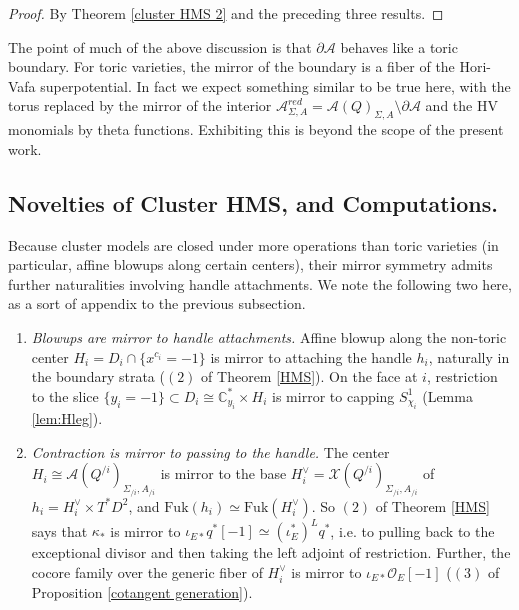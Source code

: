 \documentclass[11pt]{amsart}
\theoremstyle{definition}
\theoremstyle{remark}
\newcommand{\A}{\mathcal{A}}
\newcommand{\Fuk}{\mathrm{Fuk}}
\numberwithin{equation}{section}
\begin{document}
\begin{proof}
    By Theorem \ref{cluster HMS 2} and the preceding three results.
\end{proof}

The point of much of the above discussion is that $\partial \A$ behaves like a toric boundary. For toric varieties, the mirror of the boundary is a fiber of the Hori-Vafa superpotential. In fact we expect something similar to be true here, with the torus replaced by the mirror of the interior $\A^{red}_{\Sigma, A} = \A(Q)_{\Sigma,A}\setminus \partial \A$ and the HV monomials by theta functions. Exhibiting this is beyond the scope of the present work.

\subsection{Novelties of Cluster HMS, and Computations.}

Because cluster models are closed under more operations than toric varieties (in particular, affine blowups along certain centers), their mirror symmetry admits further naturalities involving handle attachments. We note the following two here, as a sort of appendix to the previous subsection.

\begin{enumerate}
    \item \textit{Blowups are mirror to handle attachments.} Affine blowup along the non-toric center $H_i=D_i\cap\{x^{c_i}=-1\}$ is mirror to attaching the handle $h_i$, naturally in the boundary strata ($(2)$ of Theorem \ref{HMS}). On the face at $i$, restriction to the slice $\{y_i=-1\}\subset D_i\cong\mathbb C^*_{y_i}\times H_i$ is mirror to capping $S^1_{\chi_i}$ (Lemma \ref{lem:Hleg}).

    \item \textit{Contraction is mirror to passing to the handle.} The center $H_i\cong\mathcal A(Q^{/i})_{\Sigma_{/i},A_{/i}}$ is mirror to the base $H_i^\vee=\mathcal X(Q^{/i})_{\Sigma_{/i},A_{/i}}$ of $h_i=H_i^\vee\times T^*D^2$, and $\Fuk(h_i) \simeq \Fuk(H_i^\vee)$. So $(2)$ of Theorem \ref{HMS} says that $\kappa_*$ is mirror to $\iota_{E*}q^*[-1]\simeq(\iota_E^*)^Lq^*$, i.e. to pulling back to the exceptional divisor and then taking the left adjoint of restriction. Further, the cocore family over the generic fiber of $H_i^\vee$ is mirror to $\iota_{E*}\mathcal O_E[-1]$ ($(3)$ of Proposition \ref{cotangent generation}).
\end{enumerate}
\end{document}
